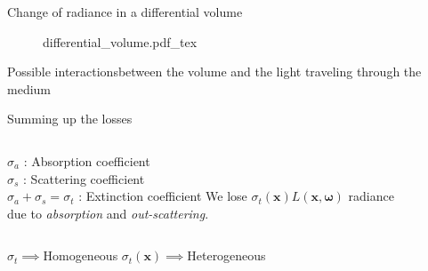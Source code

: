 \documentclass[
  english,            %
  aspectratio=169,    %
]{tumbeamer}
\newcommand\bx[0]{\bm{x}}
\newcommand\bomega[0]{\bm{\omega}}
\newcommand{\incfig}[1]{%
    \def\svgwidth{\columnwidth}
    {#1.pdf_tex}
}
\begin{document}
\begin{frame}{Change of radiance in a differential volume}
    \begin{figure}[ht]
        \centering
        \incfig{differential_volume}
        \label{fig:vre}
    \end{figure}
\end{frame}

\begin{frame}{Possible interactions}{between the volume and the light
    traveling through the medium}
\begin{figure}[ht]
    \centering
    
    \label{fig:interactions}
\end{figure}
\end{frame}

\begin{frame}{Summing up the losses}
\begin{figure}[ht]
    \centering
    
    \label{fig:interactions}
\end{figure}

\begin{columns}[t, onlytextwidth]
    $\sigma_a$ : Absorption coefficient  \\
    $\sigma_s$ : Scattering coefficient \\
    $\sigma_a + \sigma_s = \sigma_t $ : Extinction coefficient
    We lose 
    $\sigma_t(\bx)L(\bx, \bomega)$
    radiance \\ due to \textit{absorption} and \textit{out-scattering}.
\end{columns}
\vfill
\begin{columns}[t, onlytextwidth]
    $\sigma_t\implies$Homogeneous  
    $\sigma_t(\bx)\implies$Heterogeneous
\end{columns}

\end{frame}
\end{document}
